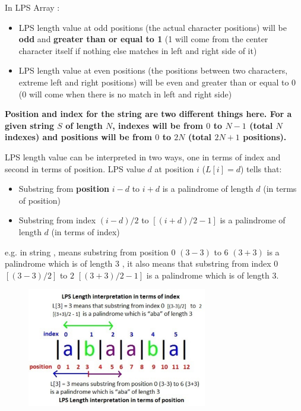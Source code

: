 In LPS Array :
\begin{itemize}%
\item LPS length value at odd positions (the actual character positions)
  will be \textbf{odd} and \textbf{greater than or equal to 1} (1 will come
  from the center character itself if nothing else matches in left and right
  side of it) 
\item LPS length value at even positions (the positions between two
  characters, extreme left and right positions) will be even and greater
  than or equal to 0 (0 will come when there is no match in left and right
  side)
\end{itemize}
\begin{mdframed}[style=mdfNOTE]
\textbf{Position and index for the string are two different things here. For
  a given string $S$ of length $N$, indexes will be from $0$ to $N-1$ (total
  $N$ indexes) and positions will be from $0$ to $2N$ (total $2N+1$
  positions).}
\end{mdframed}

LPS length value can be interpreted in two ways, one in terms of index and
second in terms of position. LPS value $d$ at position $i$ ($L[i]=d$) tells
that:
\begin{itemize}%
\item Substring from \textbf{position} $i-d$ to $i+d$ is a palindrome of
  length $d$ (in terms of position)
\item Substring from index $(i-d)/2$ to $[(i+d)/2-1]$ is a palindrome of
  length $d$ (in terms of index)
\end{itemize}
e.g. in string ,  means substring from position $0$
$(3-3)$ to $6$ $(3+3)$ is a palindrome which is  of length $3$
, it also means that substring from
index $0$ $[(3-3)/2]$ to $2$ $[(3+3)/2-1]$ is a palindrome which is
 of length $3$.

\begin{figure}
\centering
\includegraphics[width=0.7\textwidth]{Images/figGFGPalinManacher7}
\end{figure}

